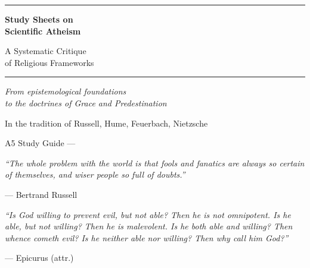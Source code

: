 \documentclass[11pt,twoside]{article}
\begin{document}
\begin{titlepage}
\centering
\vspace*{25mm}

{\color{sheetframe}\rule{\textwidth}{1.5pt}}

\vspace{10mm}

{\fontsize{22}{26}\selectfont\bfseries\sffamily\color{sectioncol}
  Study Sheets on\\[4pt]
  Scientific Atheism}

\vspace{8mm}

{\large\sffamily\color{sectioncol!70!black}
  A Systematic Critique\\[2pt]
  of Religious Frameworks}

\vspace{10mm}

{\color{sheetframe}\rule{\textwidth}{1.5pt}}

\vspace{15mm}

{\normalsize\sffamily\textit{%
  From epistemological foundations\\
  to the doctrines of Grace and Predestination}}

\vspace{10mm}

{\small\sffamily
  In the tradition of Russell, Hume, Feuerbach, Nietzsche}

\vfill

{\small\sffamily\color{gray} A5 Study Guide --- \the\year}
\end{titlepage}

\thispagestyle{empty}
\vspace*{35mm}
\begin{citazione}
\textit{``The whole problem with the world is that fools and fanatics are always
so certain of themselves, and wiser people so full of doubts.''}

\medskip
\hfill--- Bertrand Russell
\end{citazione}

\vspace{15mm}

\begin{citazione}
\textit{``Is God willing to prevent evil, but not able? Then he is not
omnipotent.  Is he able, but not willing?  Then he is malevolent.
Is he both able and willing?  Then whence cometh evil?
Is he neither able nor willing?  Then why call him God?''}

\medskip
\hfill--- Epicurus (attr.)
\end{citazione}
\end{document}
